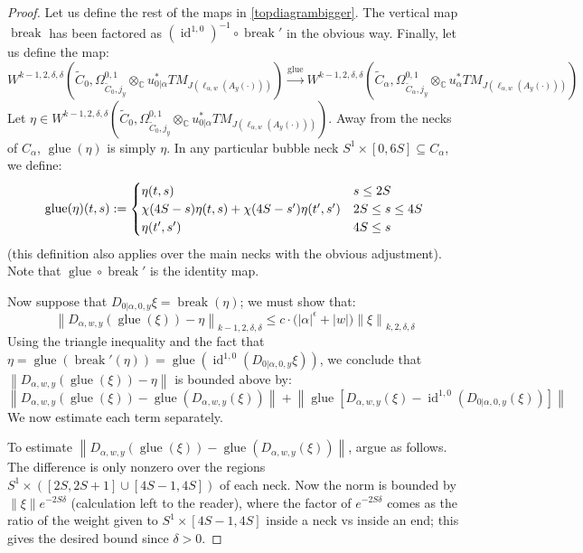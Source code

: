 \documentclass[12pt]{article}
\theoremstyle{definition}
\theoremstyle{remark}
\numberwithin{equation}{subsection}
\newcommand{\CC}{\mathbb C}
\newcommand{\id}{\operatorname{id}}
\begin{document}
\begin{proof}
Let us define the rest of the maps in \eqref{topdiagrambigger}.  The vertical map $\operatorname{break}$ has been factored as $(\id^{1,0})^{-1}\circ\operatorname{break}'$ in the obvious way.  Finally, let us define the map:
\begin{equation}
W^{k-1,2,\delta,\delta}(\tilde C_0,\Omega^{0,1}_{\tilde C_0,j_y}\otimes_\CC u_{0|\alpha}^\ast TM_{J(\ell_{\alpha,w}(A_y(\cdot)))})\xrightarrow{\mathrm{glue}}W^{k-1,2,\delta,\delta}(\tilde C_\alpha,\Omega^{0,1}_{\tilde C_\alpha,j_y}\otimes_\CC u_\alpha^\ast TM_{J(\ell_{\alpha,w}(A_y(\cdot)))})
\end{equation}
Let $\eta\in W^{k-1,2,\delta,\delta}(\tilde C_0,\Omega^{0,1}_{\tilde C_0,j_y}\otimes_\CC u_{0|\alpha}^\ast TM_{J(\ell_{\alpha,w}(A_y(\cdot)))})$.  Away from the necks of $C_\alpha$, $\operatorname{glue}(\eta)$ is simply $\eta$.  In any particular bubble neck $S^1\times[0,6S]\subseteq C_\alpha$, we define:
\begin{equation}
\operatorname{glue}(\eta)(t,s):=\begin{cases}
\eta(t,s)&s\leq 2S\cr
\chi(4S-s)\eta(t,s)+\chi(4S-s')\eta(t',s')&2S\leq s\leq 4S\cr
\eta(t',s')&4S\leq s
\end{cases}
\end{equation}
(this definition also applies over the main necks with the obvious adjustment).  Note that $\operatorname{glue}\circ\operatorname{break}'$ is the identity map.

Now suppose that $D_{0|\alpha,0,y}\xi=\operatorname{break}(\eta)$; we must show that:
\begin{equation}
\left\|D_{\alpha,w,y}(\operatorname{glue}(\xi))-\eta\right\|_{k-1,2,\delta,\delta}\leq c\cdot\bigl(\left|\alpha\right|^\epsilon+\left|w\right|\bigr)\left\|\xi\right\|_{k,2,\delta,\delta}
\end{equation}
Using the triangle inequality and the fact that $\eta=\operatorname{glue}(\operatorname{break}'(\eta))=\operatorname{glue}(\id^{1,0}(D_{0|\alpha,0,y}\xi))$, we conclude that $\left\|D_{\alpha,w,y}(\operatorname{glue}(\xi))-\eta\right\|$ is bounded above by:
\begin{equation*}
\left\|D_{\alpha,w,y}(\operatorname{glue}(\xi))-\operatorname{glue}(D_{\alpha,w,y}(\xi))\right\|+\left\|\operatorname{glue}\left[D_{\alpha,w,y}(\xi)-\id^{1,0}(D_{0|\alpha,0,y}(\xi))\right]\right\|
\end{equation*}
We now estimate each term separately.

To estimate $\left\|D_{\alpha,w,y}(\operatorname{glue}(\xi))-\operatorname{glue}(D_{\alpha,w,y}(\xi))\right\|$, argue as follows.  The difference is only nonzero over the regions $S^1\times([2S,2S+1]\cup[4S-1,4S])$ of each neck.  Now the norm is bounded by $\left\|\xi\right\|e^{-2S\delta}$ (calculation left to the reader), where the factor of $e^{-2S\delta}$ comes as the ratio of the weight given to $S^1\times[4S-1,4S]$ inside a neck vs inside an end; this gives the desired bound since $\delta>0$.


\end{proof}
\end{document}
